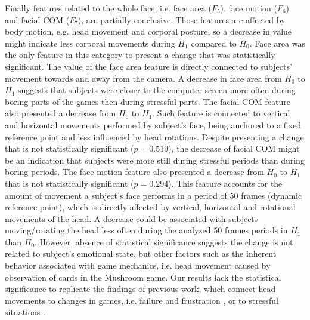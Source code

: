 Finally features related to the whole face, i.e. face area ($F_5$), face motion ($F_6$) and facial COM ($F_7$), are partially conclusive. Those features are affected by body motion, e.g. head movement and corporal posture, so a decrease in value might indicate less corporal movements during $H_1$ compared to $H_0$. Face area was the only feature in this category to present a change that was statistically significant. The value of the face area feature is directly connected to subjects' movement towards and away from the camera. A decrease in face area from $H_0$ to $H_1$ suggests that subjects were closer to the computer screen more often during boring parts of the games then during stressful parts. The facial COM feature also presented a decrease from $H_0$ to $H_1$. Such feature is connected to vertical and horizontal movements performed by subject's face, being anchored to a fixed reference point and less influenced by head rotations. Despite presenting a change that is not statistically significant ($p = 0.519$), the decrease of facial COM might be an indication that subjects were more still during stressful periods than during boring periods. The face motion feature also presented a decrease from $H_0$ to $H_1$ that is not statistically significant ($p = 0.294$). This feature accounts for the amount of movement a subject's face performs in a period of 50 frames (dynamic reference point), which is directly affected by vertical, horizontal and rotational movements of the head. A decrease could be associated with subjects moving/rotating the head less often during the analyzed 50 frames periods in $H_1$ than $H_0$. However, absence of statistical significance suggests the change is not related to subject's emotional state, but other factors such as the inherent behavior associated with game mechanics, i.e. head movement caused by observation of cards in the Mushroom game. Our results lack the statistical significance to replicate the findings of previous work, which connect head movements to changes in games, i.e. failure \cite{shaker2011game} and frustration \cite{blom2014towards}, or to stressful situations \cite{giannakakis2017stress}.

